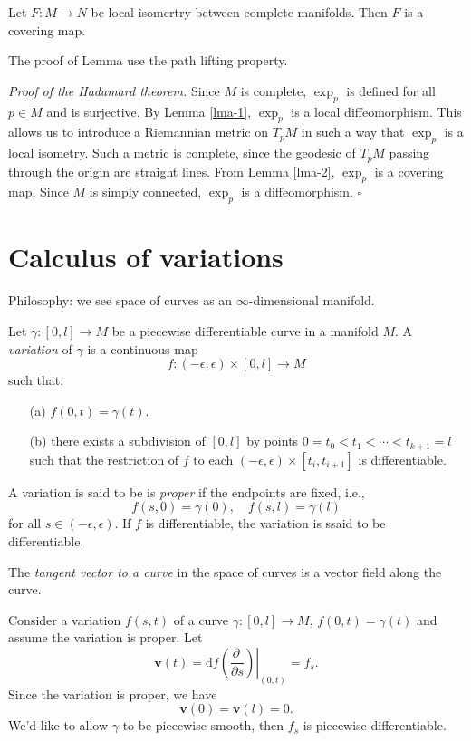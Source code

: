   \begin{lemma}\label{lma-2}
  Let $F:M\to N$ be local isomertry between complete manifolds. Then $F$ is a covering map.
\end{lemma}
The proof of Lemma \label{lma-2} use the path lifting property.

\noindent
\textit{Proof of the Hadamard theorem.} Since $M$ is complete, $\exp_p$ is defined for all $p\in M$ and is surjective. By Lemma \ref{lma-1}, $\exp_p$ is a local diffeomorphism. This allows us to introduce a Riemannian metric on $T_pM$ in such a way that $\exp_p$ is a local isometry. Such a metric is complete, since the geodesic of $T_pM$ passing through the origin are straight lines. From Lemma \ref{lma-2}, $\exp_p$ is a covering map. Since $M$ is simply connected, $\exp_p$ is a diffeomorphism.
\hfill$\square$

\section{Calculus of variations}
Philosophy: we see space of curves as an $\infty$-dimensional manifold. 
\begin{definition}
  Let $\gamma:[0,l]\to M$ be a piecewise differentiable curve in a manifold $M$. A \textit{variation} of $\gamma$ is a continuous map
  \[
    f:(-\epsilon ,\epsilon )\times [0,l]\to M
  \] 
  such that:
  \begin{itemize}
    \item [(a)]$f(0,t)=\gamma(t)$.
    \item [(b)]there exists a subdivision of $[0,l]$ by points $0=t_0<t_1<\cdots <t_{k+1}=l$ such that the restriction of $f$ to each $(-\epsilon ,\epsilon )\times [t_i,t_{i+1}]$ is differentiable.
  \end{itemize}
  A variation is said to be is \textit{proper} if the endpoints are fixed, i.e.,
\[
  f(s,0)=\gamma(0),\quad f(s,l)=\gamma(l)
\] 
for all $s\in (-\epsilon ,\epsilon )$. If $f$ is differentiable, the variation is ssaid to be differentiable.
\end{definition}

 \begin{definition}
   The \textit{tangent vector to a curve} in the space of curves is a vector field along the curve.
 \end{definition}

 Consider a variation $f(s,t)$ of a curve $\gamma:[0,l]\to M$, $f(0,t)=\gamma(t)$ and assume the variation is proper. Let 
 \[
   \mathbf{v}(t)=\left.\mathrm{d}f\left( \frac{\partial ~}{\partial s}  \right) \right|_{(0,t)}=f_s.
 \] Since the variation is proper, we have
  \[
    \mathbf{v}(0)=\mathbf{v}(l)=0.
 \] 
 We'd like to allow $\gamma$ to be piecewise smooth, then $f_s$ is piecewise differentiable.

